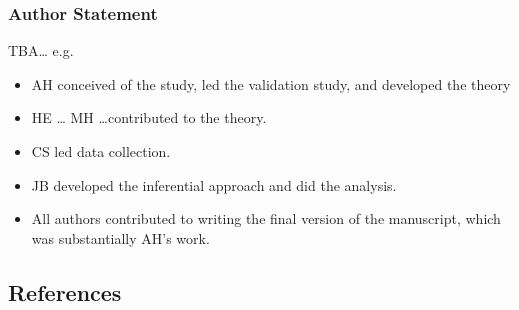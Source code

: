 \documentclass[
  singlecolumn]{article}
\providecommand{\tightlist}{%
  \setlength{\itemsep}{0pt}\setlength{\parskip}{0pt}}\usepackage{longtable,booktabs,array}
\begin{document}
\subsubsection{Author Statement}\label{author-statement}

TBA\ldots{} e.g.~

\begin{itemize}
\tightlist
\item
  AH conceived of the study, led the validation study, and developed the
  theory
\item
  HE \ldots{} MH \ldots contributed to the theory.
\item
  CS led data collection.
\item
  JB developed the inferential approach and did the analysis.\\
\item
  All authors contributed to writing the final version of the
  manuscript, which was substantially AH's work.
\end{itemize}

\newpage{}

\subsection{References}\label{references}
\end{document}
